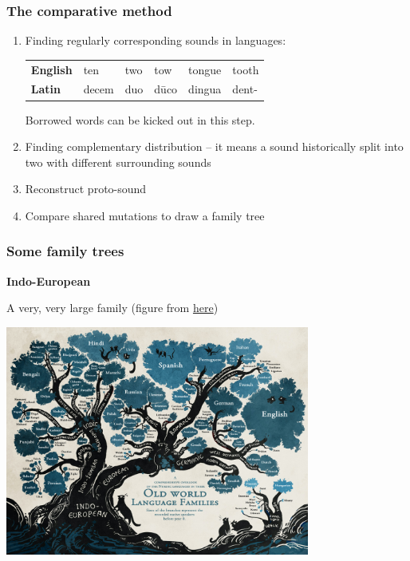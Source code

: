 \documentclass{beamer}
\begin{document}
\begin{frame}
\frametitle{The comparative method}

\begin{enumerate}
    \item Finding regularly corresponding sounds in languages:
    \begin{center}
        \begin{tabular}{llllll}
            \textbf{English} & ten   & two & tow  & tongue & tooth \\
            \textbf{Latin}   & decem & duo & dūco & dingua & dent-
            \end{tabular}
    \end{center}
    Borrowed words can be kicked out in this step.
    \item Finding complementary distribution -- it means a sound historically split into two with different surrounding sounds
    \item Reconstruct proto-sound
    \item Compare shared mutations to draw a family tree
\end{enumerate}

\end{frame}

\begin{frame}
\frametitle{Some family trees}

\textbf{Indo-European} 

A very, very large family (figure from \href{https://minio.la.utexas.edu/lrc-prod/2020/05/26/HiH9Eis2ZPO1nLC6zub2nvaXpkPVHY9G13a4UEU9.jpeg}{here})

\begin{center}
    \includegraphics[width=0.75\textwidth]{history-trees/indo-european-1.jpeg}
\end{center}

\end{frame}
\end{document}
